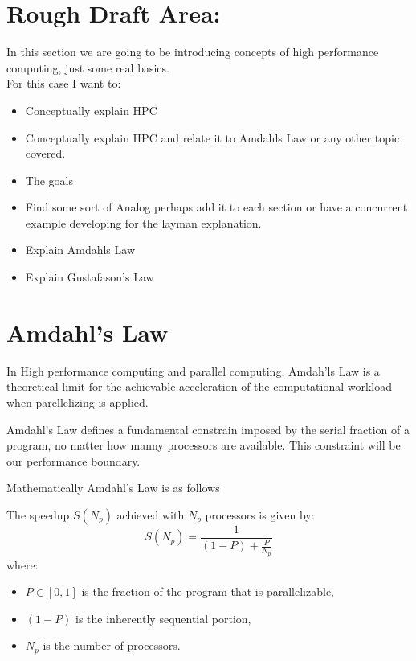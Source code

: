 \documentclass[12pt]{article}
\begin{document}

\section{Rough Draft Area:}

In this section we are going to be introducing concepts of high 
performance computing, just some real basics. \\

For this case I want to: \\

\begin{itemize}
  \item Conceptually explain HPC
  \item Conceptually explain HPC and relate it to Amdahls Law or any other topic covered.  
  \item The goals 
  \item Find some sort of Analog perhaps add it to each section or have a concurrent example developing for the layman explanation. 
  \item Explain Amdahls Law
  \item Explain Gustafason's Law
\end{itemize}

\section*{Amdahl's Law}

In High performance computing and parallel computing, Amdah'ls Law is a theoretical limit for the achievable acceleration of the computational workload when parellelizing is applied.

Amdahl's Law defines a fundamental constrain imposed by the serial
fraction of a program, no matter how manny processors are available. This constraint will be our performance boundary.

Mathematically Amdahl's Law is as follows

The speedup \( S(N_p) \) achieved with \( N_p \) processors is given by:
\[
S(N_p) = \frac{1}{(1 - P) + \frac{P}{N_p}}
\]
where:
\begin{itemize}
    \item \( P \in [0, 1] \) is the fraction of the program that is parallelizable,
    \item \( (1 - P) \) is the inherently sequential portion,
    \item \( N_p \) is the number of processors.
\end{itemize}
\end{document}
